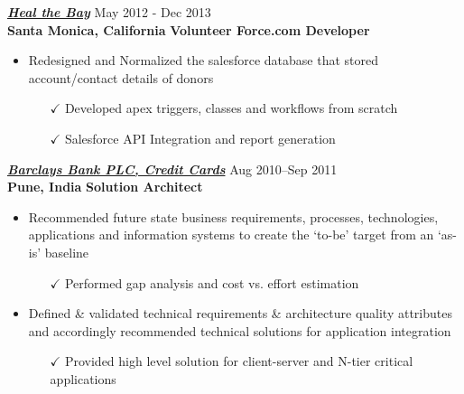 \vspace{-2pt}
{\sl \href{www.healthebay.org/?}{\textbf{Heal the Bay}}} \hfill        May 2012 - Dec 2013 \\
  {\textbf{Santa Monica, California}}     \hfill   \textbf{Volunteer Force.com Developer}
   \begin{itemize} \itemsep -2pt %
   \item {Redesigned and Normalized the salesforce database that stored account/contact details of donors} \itemsep -2pt
   \begin{itemize}\item[$\checkmark$]  \itemsep -8pt%
   Developed apex triggers, classes and workflows from scratch
   \end{itemize}
     \begin{itemize}\item[$\checkmark$]  \itemsep -8pt%
   Salesforce API Integration and report generation
    \end{itemize}
       \end{itemize}
       
     \vspace{-2pt}  
{\sl \href{www.btci.barclays.com}{\textbf{Barclays Bank PLC, Credit Cards}}} \hfill Aug 2010--Sep 2011  \\
 {\textbf{Pune, India}} \hfill   \textbf{ Solution Architect}
\begin{itemize}\itemsep -2pt
 \item {Recommended future state business requirements, processes, technologies, applications and information systems to create the `to-be' target from an `as-is' baseline} \itemsep -2pt
   \begin{itemize} \item[$\checkmark$]  \itemsep -8pt
   Performed gap analysis and cost vs. effort estimation
   \end{itemize}
    \item {Defined \& validated technical requirements \& architecture quality attributes and accordingly recommended technical solutions for application integration} \itemsep -2pt
    \begin{itemize} \item[$\checkmark$]  \itemsep -8pt 
    Provided high level solution for client-server and N-tier critical applications
   \end{itemize}
   \end{itemize}
   
   \vspace{-6pt}
 
